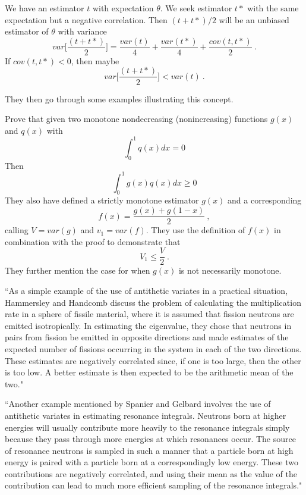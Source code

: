 \documentclass[12pt,twoside]{article}
\begin{document}
We have an estimator $t$ with expectation $\theta$. 
We seek estimator $t*$ with the same expectation but a negative correlation. 
Then $(t+t*)/2$ will be an unbiased estimator of $\theta$ with variance
\[
var \bigl[\frac{(t + t*)}{2} \bigr] = \frac{var(t)}{4} + \frac{var(t*)}{4} + \frac{cov(t,t*)}{2}\:.
\]
If $cov(t,t*) < 0$, then maybe 
\[var\bigl[\frac{(t + t*)}{2}\bigr] < var(t)\:.\]

They then go through some examples illustrating this concept. 

Prove that given two monotone nondecreasing (nonincreasing) functions $g(x)$ and $q(x)$ with 
\[
\int_0^1 q(x) dx = 0
\]
Then
\[
\int_0^1 g(x)q(x) dx \geq 0
\]
They also have defined a strictly monotone estimator $g(x)$ and a corresponding
\[
f(x) = \frac{g(x) + g(1-x)}{2}\:,
\]
calling $V = var(g)$ and $v_1 = var(f)$. 
They use the definition of $f(x)$ in combination with the proof to demonstrate that 
\[
V_1 \leq \frac{V}{2}\:.
\]
They further mention the case for when $g(x)$ is not necessarily monotone. 

``As a simple example of the use of antithetic variates  in a practical situation, Hammersley and Handcomb discuss the problem of calculating the  multiplication rate in a sphere of  fissile material, where it is assumed that fission neutrons are emitted isotropically. In estimating the eigenvalue, they chose that neutrons in pairs from fission  be emitted in opposite directions and made estimates of the expected number of  fissions occurring in the system in each of the two directions. These estimates are negatively correlated since, if one is too large, then the other is too low. A better estimate is then expected to be the arithmetic mean  of the two."  

``Another example mentioned by Spanier and Gelbard involves the use of antithetic variates in estimating resonance integrals. Neutrons born at higher  energies will usually contribute more heavily to the resonance integrals  simply  because they pass through more energies at which  resonances occur. The source of resonance neutrons is sampled in such a manner that a particle born at high energy is paired with a particle born at a correspondingly low energy. These two  contributions are negatively correlated, and using their mean as the value of the contribution can lead to much more efficient sampling of the resonance integrals."




\end{document}
